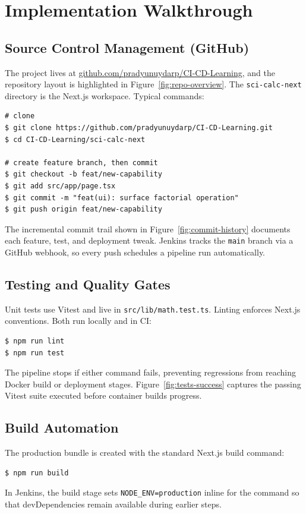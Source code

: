 \documentclass[12pt]{article}
\begin{document}
\section{Implementation Walkthrough}
\subsection{Source Control Management (GitHub)}
The project lives at \href{https://github.com/pradyunuydarp/CI-CD-Learning}{github.com/pradyunuydarp/CI-CD-Learning}, and the repository layout is highlighted in Figure~\ref{fig:repo-overview}. The \texttt{sci-calc-next} directory is the Next.js workspace. Typical commands:
\begin{verbatim}
# clone
$ git clone https://github.com/pradyunuydarp/CI-CD-Learning.git
$ cd CI-CD-Learning/sci-calc-next

# create feature branch, then commit
$ git checkout -b feat/new-capability
$ git add src/app/page.tsx
$ git commit -m "feat(ui): surface factorial operation"
$ git push origin feat/new-capability
\end{verbatim}
The incremental commit trail shown in Figure~\ref{fig:commit-history} documents each feature, test, and deployment tweak. Jenkins tracks the \texttt{main} branch via a GitHub webhook, so every push schedules a pipeline run automatically.

\subsection{Testing and Quality Gates}
Unit tests use Vitest and live in \texttt{src/lib/math.test.ts}. Linting enforces Next.js conventions. Both run locally and in CI:
\begin{verbatim}
$ npm run lint
$ npm run test
\end{verbatim}
The pipeline stops if either command fails, preventing regressions from reaching Docker build or deployment stages. Figure~\ref{fig:tests-success} captures the passing Vitest suite executed before container builds progress.

\subsection{Build Automation}
The production bundle is created with the standard Next.js build command:
\begin{verbatim}
$ npm run build
\end{verbatim}
In Jenkins, the build stage sets \texttt{NODE\_ENV=production} inline for the command so that devDependencies remain available during earlier steps.
\end{document}
